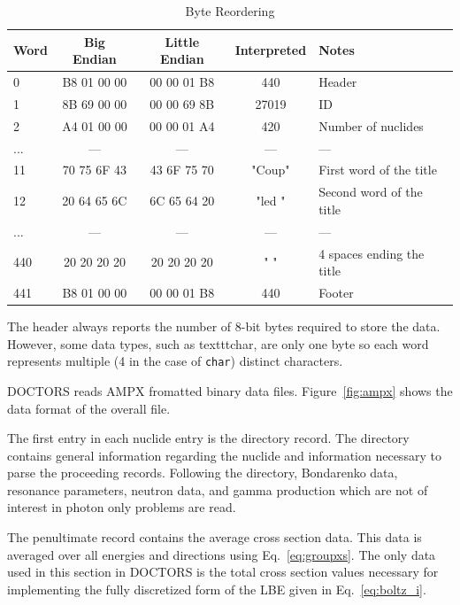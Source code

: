 \begin{table}[ht]
\caption{Byte Reordering}
\centering 
\begin{tabular}{l | c | c | c | l}
  \hline \hline   
  Word  & Big Endian & Little Endian & Interpreted & Notes\\ [0.5ex] %
  \hline
  0   & B8 01 00 00 & 00 00 01 B8 & 440    & Header                    \\
  1   & 8B 69 00 00 & 00 00 69 8B & 27019  & ID                        \\
  2   & A4 01 00 00 & 00 00 01 A4 & 420    & Number of nuclides        \\
  ... &      ---    &      ---    &    --- & ---                       \\
  11  & 70 75 6F 43 & 43 6F 75 70 & "Coup" & First word of the title   \\
  12  & 20 64 65 6C & 6C 65 64 20 & "led " & Second word of the title  \\
  ... &     ---     &    ---      &  ---   & ---                       \\
  440 & 20 20 20 20 & 20 20 20 20 & "    " & 4 spaces ending the title \\
  441 & B8 01 00 00 & 00 00 01 B8 & 440    & Footer                    \\ 
  [1ex]      %
  \hline
\end{tabular}
\label{table:reorder}
\end{table}

The header always reports the number of 8-bit bytes required to store the data. However, some data types, such as texttt{char}, are only one byte so each word represents multiple (4 in the case of \texttt{char}) distinct characters.

DOCTORS reads AMPX fromatted binary data files. Figure~\ref{fig:ampx} shows the data format of the overall file. 

The first entry in each nuclide entry is the directory record. The directory contains general information regarding the nuclide and information necessary to parse the proceeding records. Following the directory, Bondarenko data, resonance parameters, neutron data, and gamma production which are not of interest in photon only problems are read.

The penultimate record contains the average cross section data. This data is averaged over all energies and directions using Eq.~\ref{eq:groupxs}. The only data used in this section in DOCTORS is the total cross section values necessary for implementing the fully discretized form of the LBE given in Eq.~\ref{eq:boltz_i}.

